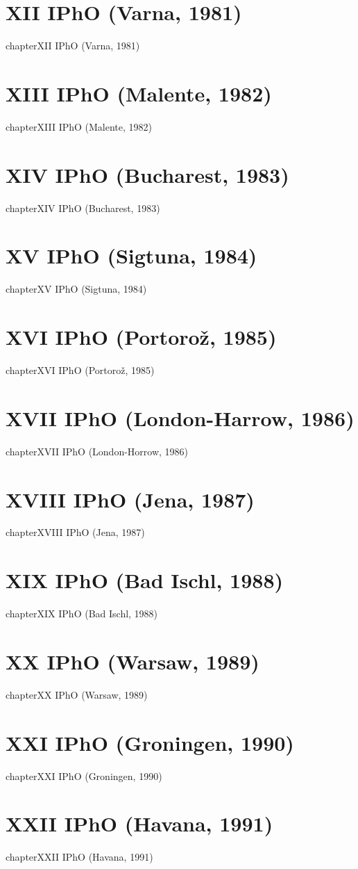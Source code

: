 \documentclass[12pt,a4paper]{book}
\begin{document}
\chapter*{XII IPhO (Varna, 1981)}
{chapter}{XII IPhO (Varna, 1981)}
\chapter*{XIII IPhO (Malente, 1982)}
{chapter}{XIII IPhO (Malente, 1982)}
\chapter*{XIV IPhO (Bucharest, 1983)}
{chapter}{XIV IPhO (Bucharest, 1983)}
\chapter*{XV IPhO (Sigtuna, 1984)}
{chapter}{XV IPhO (Sigtuna, 1984)}
\chapter*{XVI IPhO (Portoro\v{z}, 1985)}
{chapter}{XVI IPhO (Portoro\v{z}, 1985)}
\chapter*{XVII IPhO (London-Harrow, 1986)}
{chapter}{XVII IPhO (London-Horrow, 1986)}
\chapter*{XVIII IPhO (Jena, 1987)}
{chapter}{XVIII IPhO (Jena, 1987)}
\chapter*{XIX IPhO (Bad Ischl, 1988)}
{chapter}{XIX IPhO (Bad Ischl, 1988)}
\chapter*{XX IPhO (Warsaw, 1989)}
{chapter}{XX IPhO (Warsaw, 1989)}
\chapter*{XXI IPhO (Groningen, 1990)}
{chapter}{XXI IPhO (Groningen, 1990)}
\chapter*{XXII IPhO (Havana, 1991)}
{chapter}{XXII IPhO (Havana, 1991)}
\end{document}

